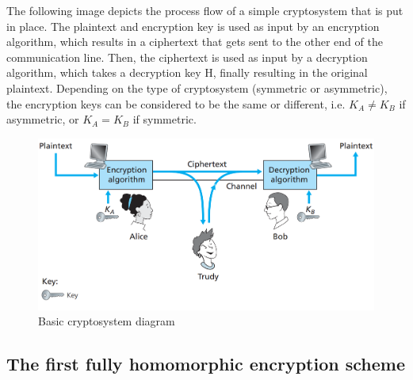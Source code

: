 The following image depicts the process flow of a simple cryptosystem that is put in place. The plaintext and encryption key is used as input by an encryption algorithm, which results in a ciphertext that gets sent to the other end of the communication line. Then, the ciphertext is used as input by a decryption algorithm, which takes a decryption key H, finally resulting in the original plaintext. Depending on the type of cryptosystem (symmetric or asymmetric), the encryption keys can be considered to be the same or different, i.e. $K_{A}\ne K_{B}$ if asymmetric, or $K_{A} = K_{B}$ if symmetric.

\begin{figure}[H]
  \centerline{\includegraphics[width=14cm]{img/basic_crypto}}
  \caption{Basic cryptosystem diagram\cite{kurose2010computer}}
\end{figure}

\subsection{The first fully homomorphic encryption scheme}


